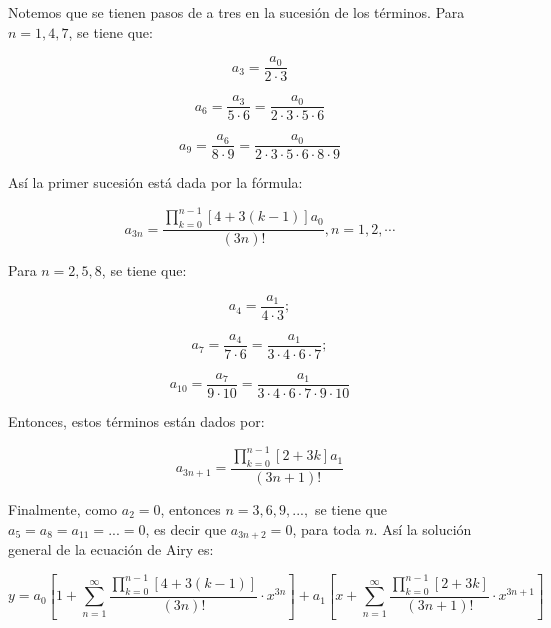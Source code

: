 Notemos que se tienen pasos de a tres en la sucesión de los términos. Para $n=1, 4, 7$, se tiene que: 

\begin{equation*}
    a_3= \frac{a_0}{2 \cdot 3}
\end{equation*}

\begin{equation*}
    a_6= \frac{a_3}{5 \cdot 6}= \frac{a_0}{2 \cdot 3 \cdot 5 \cdot 6}
\end{equation*}

\begin{equation*}
    a_9= \frac{a_6}{8 \cdot 9}= \frac{a_0}{2 \cdot 3 \cdot 5 \cdot 6 \cdot 8 \cdot 9}
\end{equation*}
    
Así la primer sucesión está dada por la fórmula: 

\begin{equation*}
    a_{3n}= \frac{\displaystyle\prod_{k=0}^{n-1}[4+3(k-1)]a_0}{(3n)!}, n=1, 2, \cdots 
\end{equation*}

Para $n=2, 5, 8$, se tiene que:

\begin{equation*}
    a_4= \frac{a_1}{4 \cdot 3};
\end{equation*}

\begin{equation*}
    a_7= \frac{a_4}{7 \cdot 6}= \frac{a_1}{3 \cdot 4 \cdot 6 \cdot 7 };
\end{equation*}

\begin{equation*}
    a_{10}= \frac{a_7}{9 \cdot 10}= \frac{a_1}{3 \cdot 4 \cdot 6 \cdot 7 \cdot 9 \cdot 10}
\end{equation*}

Entonces, estos términos están dados por: 

\begin{equation*}
    a_{3n+1}= \frac{\displaystyle\prod_{k=0}^{n-1}[2+3k]a_1}{(3n+1)!}
\end{equation*}

Finalmente, como $a_2=0$, entonces $n=3, 6, 9, ..., $ se tiene que $a_5= a_8= a_11= ... =0$, es decir que $a_{3n+2}=0$, para toda $n$. Así la solución general de la ecuación de Airy es: 

\begin{equation*}
    y= a_0 \left[1+ \displaystyle\sum_{n=1}^{\infty} \frac{\displaystyle\prod_{k=0}^{n-1} [4+3(k-1)]}{(3n)!} \cdot x^{3n} \right] + a_1 \left[x+ \displaystyle\sum_{n=1}^{\infty} \frac{\displaystyle\prod_{k=0}^{n-1}[2+3k]}{(3n+1)!} \cdot x^{3n+1}\right]
\end{equation*}
    